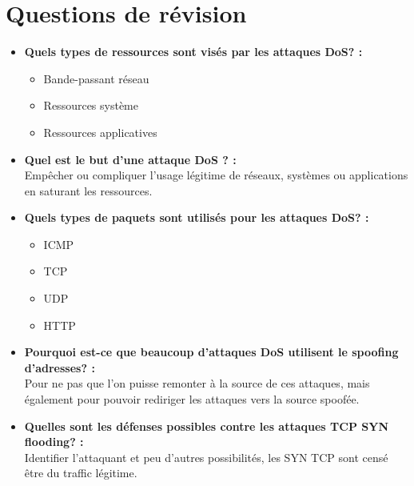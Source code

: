 \documentclass{report}
\begin{document}
		\section{Questions de révision}

			\begin{itemize}
				\item \textbf{Quels types de ressources sont visés par les attaques DoS? : }\\

					\begin{itemize}
						\item Bande-passant réseau
						\item Ressources système
						\item Ressources applicatives
					\end{itemize}

				\item \textbf{Quel est le but d'une attaque DoS ? :}\\

					Empêcher ou compliquer l'usage légitime de réseaux, systèmes ou applications en saturant les ressources.\\

				\item \textbf{Quels types de paquets sont utilisés pour les attaques DoS? :}\\

					\begin{itemize}
						\item ICMP
						\item TCP
						\item UDP
						\item HTTP	
					\end{itemize}

				\item \textbf{Pourquoi est-ce que beaucoup d'attaques DoS utilisent le spoofing d'adresses? : }\\

					Pour ne pas que l'on puisse remonter à la source de ces attaques, mais également pour pouvoir rediriger les attaques vers la source spoofée.\\

				\item \textbf{Quelles sont les défenses possibles contre les attaques TCP SYN flooding? : }\\

					Identifier l'attaquant et peu d'autres possibilités, les SYN TCP sont censé être du traffic légitime.\\


\end{itemize}
\end{document}
